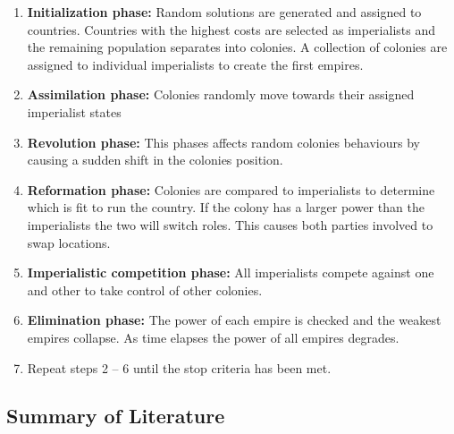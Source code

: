 \documentclass{AISB2008}
\begin{document}
\begin{enumerate}
\item \textbf{Initialization phase:} Random solutions are generated and assigned to countries. Countries with the highest costs are selected as imperialists and the remaining population separates into colonies. A collection of colonies are assigned to individual imperialists to create the first empires. 
\item \textbf{Assimilation phase:} Colonies randomly move towards their assigned imperialist states 
\item \textbf{Revolution phase:} This phases affects random colonies behaviours by causing a sudden shift in the colonies position.
\item \textbf{Reformation phase:} Colonies are compared to imperialists to determine which is fit to run the country. If the colony has a larger power than the imperialists the two will switch roles. This causes both parties involved to swap locations.
\item \textbf{Imperialistic competition phase:} All imperialists compete against one and other to take control of other colonies.
\item \textbf{Elimination phase:} The power of each empire is checked and the weakest empires collapse. As time elapses the power of all empires degrades.
\item Repeat steps 2 – 6 until the stop criteria has been met.
\end{enumerate}

\subsection{Summary of Literature}
\end{document}
